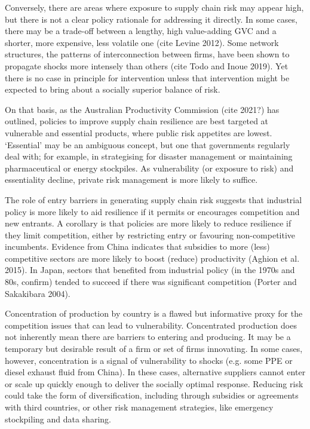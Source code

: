 \documentclass{article}
\begin{document}
Conversely, there are areas where exposure to supply chain risk may appear high, but there is not a clear policy rationale for addressing it directly. In some cases, there may be a trade-off between a lengthy, high value-adding GVC and a shorter, more expensive, less volatile one (cite Levine 2012). Some network structures, the patterns of interconnection between firms, have been shown to propagate shocks more intensely than others (cite Todo and Inoue 2019). Yet there is no case in principle for intervention unless that intervention might be expected to bring about a socially superior balance of risk.

On that basis, as the Australian Productivity Commission (cite 2021?) has outlined, policies to improve supply chain resilience are best targeted at vulnerable and essential products, where public risk appetites are lowest. `Essential' may be an ambiguous concept, but one that governments regularly deal with; for example, in strategising for disaster management or maintaining pharmaceutical or energy stockpiles. As vulnerability (or exposure to risk) and essentiality decline, private risk management is more likely to suffice. 

The role of entry barriers in generating supply chain risk suggests that industrial policy is more likely to aid resilience if it permits or encourages competition and new entrants. A corollary is that policies are more likely to reduce resilience if they limit competition, either by restricting entry or favouring non-competitive incumbents. Evidence from China indicates that subsidies to more (less) competitive sectors are more likely to boost (reduce) productivity (Aghion et al. 2015). In Japan, sectors that benefited from industrial policy (in the 1970s and 80s, confirm) tended to succeed if there was significant competition (Porter and Sakakibara 2004).

Concentration of production by country is a flawed but informative proxy for the competition issues that can lead to vulnerability. Concentrated production does not inherently mean there are barriers to entering and producing. It may be a temporary but desirable result of a firm or set of firms innovating. In some cases, however, concentration is a signal of vulnerability to shocks (e.g. some PPE or diesel exhaust fluid from China). In these cases, alternative suppliers cannot enter or scale up quickly enough to deliver the socially optimal response. Reducing risk could take the form of diversification, including through subsidies or agreements with third countries, or other risk management strategies, like emergency stockpiling and data sharing.
\end{document}
